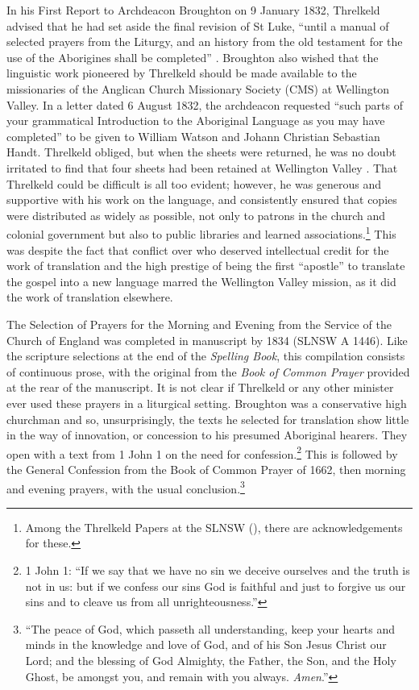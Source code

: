 {In his First Report to Archdeacon Broughton on 9 January 1832, Threlkeld advised that he had set aside the final revision of St Luke, “until a manual of selected prayers from the Liturgy, and an history from the old testament for the use of the Aborigines shall be completed” \citep[115]{gunson_australian_1974a}. Broughton also wished that the linguistic work pioneered by Threlkeld should be made available to the missionaries of the Anglican Church Missionary Society (CMS) at Wellington Valley. In a letter dated 6 August 1832, the archdeacon requested “such parts of your grammatical Introduction to the Aboriginal Language as you may have completed” to be given to William Watson and Johann Christian Sebastian Handt. Threlkeld obliged, but when the sheets were returned, he was no doubt irritated to find that four sheets had been retained at Wellington Valley \citep[116]{gunson_australian_1974a}. That Threlkeld could be difficult is all too evident; however, he was generous and supportive with his work on the language, and consistently ensured that copies were distributed as widely as possible, not only to patrons in the church and colonial government but also to public libraries and learned associations.\footnote{Among the Threlkeld Papers at the SLNSW (\citeyear{threlkeld_threlkeld_1822-1862}), there are acknowledgements for these.} This was despite the fact that conflict over who deserved intellectual credit for the work of translation and the high prestige of being the first “apostle” to translate the gospel into a new language marred the Wellington Valley mission, as it did the work of translation elsewhere.

The Selection of Prayers for the Morning and Evening from the Service of the Church of England was completed in manuscript by 1834 (SLNSW A 1446). Like the scripture selections at the end of the \textit{Spelling Book}, this compilation consists of continuous prose, with the original from the \textit{Book of Common Prayer} provided at the rear of the manuscript. It is not clear if Threlkeld or any other minister ever used these prayers in a liturgical setting. Broughton was a conservative high churchman and so, unsurprisingly, the texts he selected for translation show little in the way of innovation, or concession to his presumed Aboriginal hearers. They open with a text from 1 John 1 on the need for confession.\footnote{1 John 1: “If we say that we have no sin we deceive ourselves and the truth is not in us: but if we confess our sins God is faithful and just to forgive us our sins and to cleave us from all unrighteousness.”} This is followed by the General Confession from the Book of Common Prayer of 1662, then morning and evening prayers, with the usual conclusion.\footnote{“The peace of God, which passeth all understanding, keep your hearts and minds in the knowledge and love of God, and of his Son Jesus Christ our Lord; and the blessing of God Almighty, the Father, the Son, and the Holy Ghost, be amongst you, and remain with you always. \textit{Amen}.”}

}
